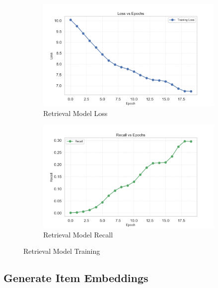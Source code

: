 \begin{figure}[H]
    \centering
    \begin{subfigure}{.5\textwidth}
        \centering
        \includegraphics[width=0.95\linewidth]{assets/training_loss.png}
        \caption[Retrieval Model Loss]{Retrieval Model Loss}
        \label{fig:RetrievalModelLoss}
    \end{subfigure}%
    \begin{subfigure}{.5\textwidth}
        \centering
        \includegraphics[width=0.95\linewidth]{assets/recall_epochs.png}
        \caption[Retrieval Model Recall]{Retrieval Model Recall}
        \label{fig:RetrievalModelRecall}
    \end{subfigure}
    \caption[Retrieval Model Training]{Retrieval Model Training}
    \label{fig:RetrievalModelTraining}
\end{figure}


\subsection{Generate Item Embeddings}

